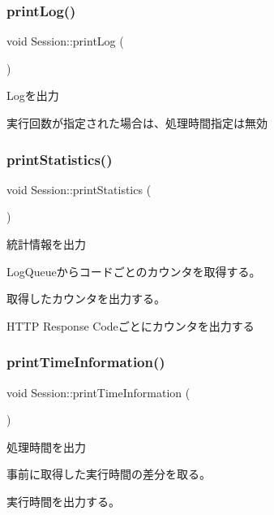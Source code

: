 \subsubsection{\texorpdfstring{printLog()}{printLog()}}
{\footnotesize\ttfamily void Session\+::print\+Log (\begin{DoxyParamCaption}{ }\end{DoxyParamCaption})}



Logを出力 

実行回数が指定された場合は、処理時間指定は無効 \mbox{\label{class_session_ae59450c62e173a51a22b50764f205bc6}} 
\subsubsection{\texorpdfstring{printStatistics()}{printStatistics()}}
{\footnotesize\ttfamily void Session\+::print\+Statistics (\begin{DoxyParamCaption}{ }\end{DoxyParamCaption})}



統計情報を出力 

Log\+Queueからコードごとのカウンタを取得する。

取得したカウンタを出力する。

H\+T\+TP Response Codeごとにカウンタを出力する \mbox{\label{class_session_a1b0a0eee5c4429fd148d796e6add79cd}} 
\subsubsection{\texorpdfstring{printTimeInformation()}{printTimeInformation()}}
{\footnotesize\ttfamily void Session\+::print\+Time\+Information (\begin{DoxyParamCaption}{ }\end{DoxyParamCaption})}



処理時間を出力 

事前に取得した実行時間の差分を取る。

実行時間を出力する。 \mbox{\label{class_session_a373987ee33c3e34612b56eb6f21bee42}} 

